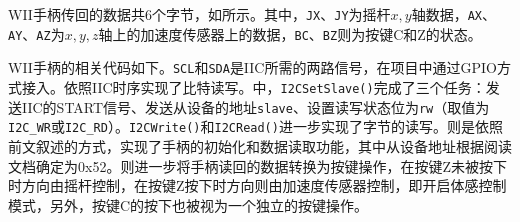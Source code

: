 WII手柄传回的数据共$6$个字节，如所示。其中，\texttt{JX}、\texttt{JY}为摇杆$x,y$轴数据，\texttt{AX}、\texttt{AY}、\texttt{AZ}为$x,y,z$轴上的加速度传感器上的数据，\texttt{BC}、\texttt{BZ}则为按键C和Z的状态。

WII手柄的相关代码如下。\texttt{SCL}和\texttt{SDA}是IIC所需的两路信号，在项目中通过GPIO方式接入。依照IIC时序实现了比特读写。中，\texttt{I2CSetSlave()}完成了三个任务：发送IIC的START信号、发送从设备的地址\texttt{slave}、设置读写状态位为\texttt{rw}（取值为\texttt{I2C\_WR}或\texttt{I2C\_RD}）。\texttt{I2CWrite()}和\texttt{I2CRead()}进一步实现了字节的读写。则是依照前文叙述的方式，实现了手柄的初始化和数据读取功能，其中从设备地址根据阅读文档确定为0x52。则进一步将手柄读回的数据转换为按键操作，在按键Z未被按下时方向由摇杆控制，在按键Z按下时方向则由加速度传感器控制，即开启体感控制模式，另外，按键C的按下也被视为一个独立的按键操作。







